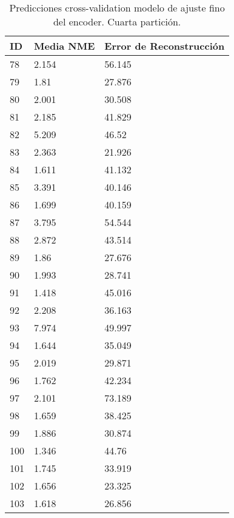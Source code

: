 \begin{table}[!ht]
    \centering
    \caption{Predicciones cross-validation modelo de ajuste fino del encoder. Cuarta partición.}
    \begin{tabular}{|l|l|l|}
    \hline
    \cellcolor{gray!25}\textbf{ID} & \cellcolor{gray!25}\textbf{Media NME} & \cellcolor{gray!25}\textbf{Error de Reconstrucción} \\ \hline
        78 & 2.154 & 56.145 \\ \hline
        79 & 1.81 & 27.876 \\ \hline
        80 & 2.001 & 30.508 \\ \hline
        81 & 2.185 & 41.829 \\ \hline
        82 & 5.209 & 46.52 \\ \hline
        83 & 2.363 & 21.926 \\ \hline
        84 & 1.611 & 41.132 \\ \hline
        85 & 3.391 & 40.146 \\ \hline
        86 & 1.699 & 40.159 \\ \hline
        87 & 3.795 & 54.544 \\ \hline
        88 & 2.872 & 43.514 \\ \hline
        89 & 1.86 & 27.676 \\ \hline
        90 & 1.993 & 28.741 \\ \hline
        91 & 1.418 & 45.016 \\ \hline
        92 & 2.208 & 36.163 \\ \hline
        93 & 7.974 & 49.997 \\ \hline
        94 & 1.644 & 35.049 \\ \hline
        95 & 2.019 & 29.871 \\ \hline
        96 & 1.762 & 42.234 \\ \hline
        97 & 2.101 & 73.189 \\ \hline
        98 & 1.659 & 38.425 \\ \hline
        99 & 1.886 & 30.874 \\ \hline
        100 & 1.346 & 44.76 \\ \hline
        101 & 1.745 & 33.919 \\ \hline
        102 & 1.656 & 23.325 \\ \hline
        103 & 1.618 & 26.856 \\ \hline
    \end{tabular}
\end{table}


